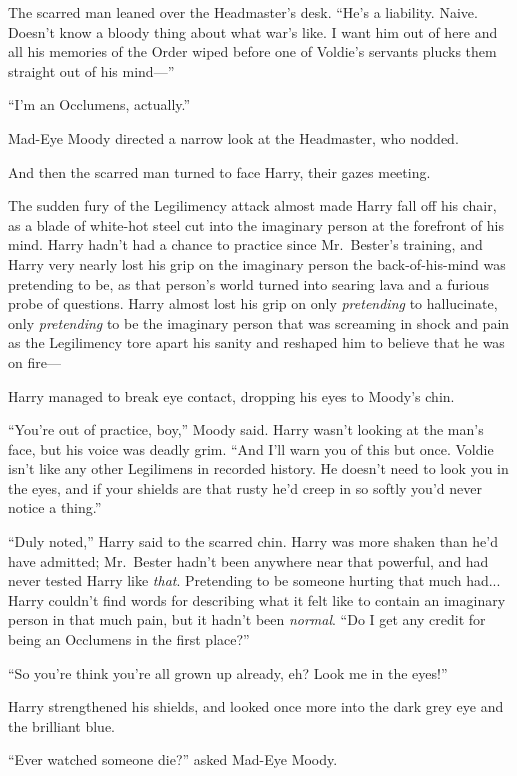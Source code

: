 The scarred man leaned over the Headmaster’s desk. “He’s a liability. Naive. Doesn’t know a bloody thing about what war’s like. I want him out of here and all his memories of the Order wiped before one of Voldie’s servants plucks them straight out of his mind—”

“I’m an Occlumens, actually.”

Mad-Eye Moody directed a narrow look at the Headmaster, who nodded.

And then the scarred man turned to face Harry, their gazes meeting.

The sudden fury of the Legilimency attack almost made Harry fall off his chair, as a blade of white-hot steel cut into the imaginary person at the forefront of his mind. Harry hadn’t had a chance to practice since Mr.~Bester’s training, and Harry very nearly lost his grip on the imaginary person the back-of-his-mind was pretending to be, as that person’s world turned into searing lava and a furious probe of questions. Harry almost lost his grip on only \emph{pretending} to hallucinate, only \emph{pretending} to be the imaginary person that was screaming in shock and pain as the Legilimency tore apart his sanity and reshaped him to believe that he was on fire—

Harry managed to break eye contact, dropping his eyes to Moody’s chin.

“You’re out of practice, boy,” Moody said. Harry wasn’t looking at the man’s face, but his voice was deadly grim. “And I’ll warn you of this but once. Voldie isn’t like any other Legilimens in recorded history. He doesn’t need to look you in the eyes, and if your shields are that rusty he’d creep in so softly you’d never notice a thing.”

“Duly noted,” Harry said to the scarred chin. Harry was more shaken than he’d have admitted; Mr.~Bester hadn’t been anywhere near that powerful, and had never tested Harry like \emph{that}. Pretending to be someone hurting that much had... Harry couldn’t find words for describing what it felt like to contain an imaginary person in that much pain, but it hadn’t been \emph{normal}. “Do I get any credit for being an Occlumens in the first place?”

“So you’re think you’re all grown up already, eh? Look me in the eyes!”

Harry strengthened his shields, and looked once more into the dark grey eye and the brilliant blue.

“Ever watched someone die?” asked Mad-Eye Moody.

